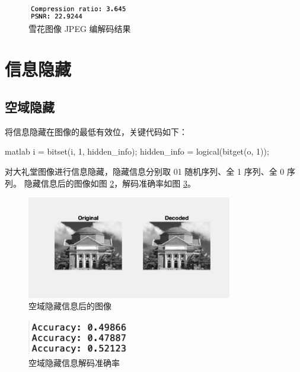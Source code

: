 \documentclass[a4paper]{article}  %
\begin{document}
\begin{figure}[ht]
    \centering
    \includegraphics[width=0.4\textwidth]{asserts/2_13_res.png}
    \caption{
        雪花图像 JPEG 编解码结果
    }\label{fig:2_13_res}
\end{figure}

\section{信息隐藏}

\subsection{空域隐藏}

将信息隐藏在图像的最低有效位，关键代码如下：

\begin{codeblock}{matlab}
i = bitset(i, 1, hidden_info);
hidden_info = logical(bitget(o, 1));
\end{codeblock}

对大礼堂图像进行信息隐藏，隐藏信息分别取 01 随机序列、全 1 序列、全 0 序列。
隐藏信息后的图像如图 \ref{fig:3_1_decode}，解码准确率如图 \ref{fig:3_1_res}。

\begin{figure}[ht]
    \centering
    \includegraphics[width=0.8\textwidth]{asserts/3_1_decode.png}
    \caption{
        空域隐藏信息后的图像
    }\label{fig:3_1_decode}
\end{figure}

\begin{figure}[ht]
    \centering
    \includegraphics[width=0.4\textwidth]{asserts/3_1_res.png}
    \caption{
        空域隐藏信息解码准确率
    }\label{fig:3_1_res}
\end{figure}
\end{document}

